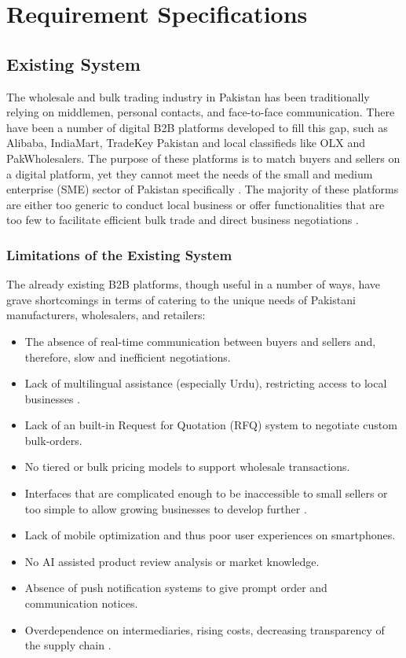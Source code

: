 \chapter{Requirement Specifications} \label{chap:reqs}


\section*{}
\section{Existing System}
The wholesale and bulk trading industry in Pakistan has been traditionally relying on middlemen, personal contacts, and face-to-face communication. There have been a number of digital B2B platforms developed to fill this gap, such as Alibaba, IndiaMart, TradeKey Pakistan and local classifieds like OLX and PakWholesalers. The purpose of these platforms is to match buyers and sellers on a digital platform, yet they cannot meet the needs of the small and medium enterprise (SME) sector of Pakistan specifically \cite{ali2022ecommerce}. The majority of these platforms are either too generic to conduct local business or offer functionalities that are too few to facilitate efficient bulk trade and direct business negotiations \cite{hussain2023supply}.

\subsection{Limitations of the Existing System}
The already existing B2B platforms, though useful in a number of ways, have grave shortcomings in terms of catering to the unique needs of Pakistani manufacturers, wholesalers, and retailers:

\begin{itemize}
    \item The absence of real-time communication between buyers and sellers and, therefore, slow and inefficient negotiations.
    \item Lack of multilingual assistance (especially Urdu), restricting access to local businesses \cite{akram2022user}.
    \item Lack of an built-in Request for Quotation (RFQ) system to negotiate custom bulk-orders.
    \item No tiered or bulk pricing models to support wholesale transactions.
    \item  Interfaces that are complicated enough to be inaccessible to small sellers or too simple to allow growing businesses to develop further \cite{han2023digital}.
    \item Lack of mobile optimization and thus poor user experiences on smartphones.
    \item No AI assisted product review analysis or market knowledge.
    \item Absence of push notification systems to give prompt order and communication notices.
    \item Overdependence on intermediaries, rising costs, decreasing transparency of the supply chain \cite{raza2023impact}.
\end{itemize}


